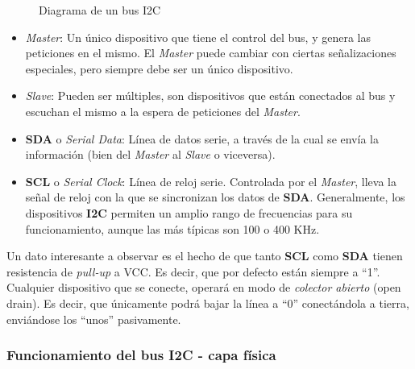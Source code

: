\documentclass[../main.tex]{subfiles}
\begin{document}
\begin{figure}[hb]
            \caption{Diagrama de un bus I2C}
            \label{fig:i2c_bus}
        \end{figure}

        \begin{itemize}
            \item \emph{Master}: Un único dispositivo que tiene el control del bus, y genera las peticiones en el mismo. El \emph{Master} puede cambiar con ciertas señalizaciones especiales, pero siempre debe ser un único dispositivo.
            \item \emph{Slave}: Pueden ser múltiples, son dispositivos que están conectados al bus y escuchan el mismo a la espera de peticiones del \emph{Master}.
            \item \textbf{SDA} o \emph{Serial Data}: Línea de datos serie, a través de la cual se envía la información (bien del \emph{Master} al \emph{Slave} o viceversa).
            \item \textbf{SCL} o \emph{Serial Clock}: Línea de reloj serie. Controlada por el \emph{Master}, lleva la señal de reloj con la que se sincronizan los datos de \textbf{SDA}. Generalmente, los dispositivos \textbf{I2C} permiten un amplio rango de frecuencias para su funcionamiento, aunque las más típicas son 100 o 400 KHz.
        \end{itemize}

        Un dato interesante a observar es el hecho de que tanto \textbf{SCL} como \textbf{SDA} tienen resistencia de \emph{pull-up} a VCC. Es decir, que por defecto están siempre a ``1''. Cualquier dispositivo que se conecte, operará en modo de \emph{colector abierto} (open drain). Es decir, que únicamente podrá bajar la línea a ``0'' conectándola a tierra, enviándose los ``unos'' pasivamente.

        \subsubsection{Funcionamiento del bus I2C - capa física}
\end{document}
